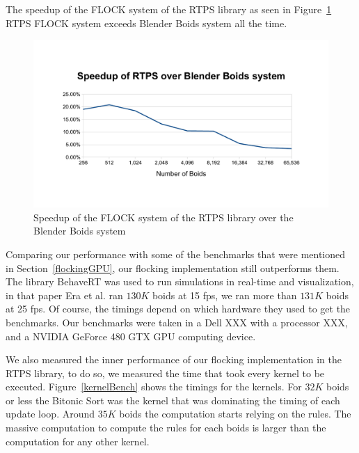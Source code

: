 The speedup of the FLOCK system of the RTPS library as seen in Figure~\ref{speedup} RTPS FLOCK system exceeds Blender Boids system all the time.

\begin{figure}[htbp]
\begin{center}
\includegraphics[scale=0.55]{figures/speedup.pdf}
\caption{Speedup of the FLOCK system of the RTPS library over the Blender Boids system}
\label{speedup}
\end{center}
\end{figure}


Comparing our performance with some of the benchmarks that were mentioned in Section~\ref{flockingGPU}, our flocking implementation still outperforms them. The library BehaveRT was used to run simulations in real-time and visualization, in that paper Era et al. ran $130K$ boids at 15 fps, we ran more than $131K$ boids at 25 fps. Of course, the timings depend on which hardware they used to get the benchmarks. Our benchmarks were taken in a Dell XXX with a processor XXX, and a NVIDIA GeForce 480 GTX GPU computing device. 

We also measured the inner performance of our flocking implementation in the RTPS library, to do so, we measured the time that took every kernel to be executed. Figure~\ref{kernelBench} shows the timings for the kernels. For $32K$ boids or less the Bitonic Sort was the kernel that was dominating the timing of each update loop. Around $35K$ boids the computation starts relying on the rules. The massive computation to compute the rules for each boids is larger than the computation for any other kernel.

